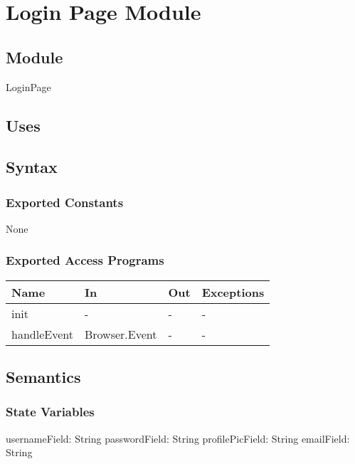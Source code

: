 \documentclass[12pt, titlepage]{article}
\begin{document}
\newpage

\section{Login Page Module}\label{LoginPage} 

\subsection{Module}

LoginPage

\subsection{Uses}

\subsection{Syntax}

\subsubsection{Exported Constants}

None

\subsubsection{Exported Access Programs}

\begin{center}
\begin{tabular}{| p{4cm} | p{4cm} | p{4cm} | p{3cm} | }
\hline
\textbf{Name} & \textbf{In} & \textbf{Out} & \textbf{Exceptions} \\
\hline
init & - & - & - \\
handleEvent & Browser.Event & - & -\\
\hline
\end{tabular}
\end{center}

\subsection{Semantics}

\subsubsection{State Variables}

usernameField: String
passwordField: String
profilePicField: String
emailField: String
\end{document}
